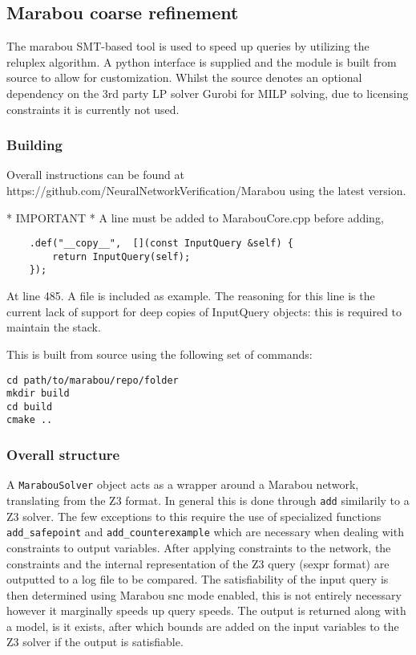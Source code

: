 \documentclass[a4paper,parskip=half]{scrartcl}
\begin{document}
\subsection{Marabou coarse refinement}

The marabou SMT-based tool is used to speed up queries by utilizing the reluplex algorithm. A python interface is supplied and the module is built from source to allow for customization. Whilst the source denotes an optional dependency on the 3rd party LP solver Gurobi for MILP solving, due to licensing constraints it is currently not used.

\subsubsection{Building}

Overall instructions can be found at https://github.com/NeuralNetworkVerification/Marabou using the latest version. 

* IMPORTANT * 
A line must be added to MarabouCore.cpp before adding, 

\begin{verbatim}
    .def("__copy__",  [](const InputQuery &self) {
        return InputQuery(self);
    });
\end{verbatim}

At line 485. A file is included as example. The reasoning for this line is the current lack of support for deep copies of InputQuery objects: this is required to maintain the stack.

This is built from source using the following set of commands:

\begin{verbatim}
cd path/to/marabou/repo/folder
mkdir build 
cd build
cmake ..
\end{verbatim}

\subsubsection{Overall structure}

A \verb+MarabouSolver+ object acts as a wrapper around a Marabou network, translating from the Z3 format. In general this is done through \verb+add+ similarily to a Z3 solver. The few exceptions to this require the use of specialized functions \verb+add_safepoint+ and \verb+add_counterexample+ which are necessary when dealing with constraints to output variables. After applying constraints to the network, the constraints and the internal representation of the Z3 query (sexpr format) are outputted to a log file to be compared. The satisfiability of the input query is then determined using Marabou snc mode enabled, this is not entirely necessary however it marginally speeds up query speeds. The output is returned along with a model, is it exists, after which bounds are added on the input variables to the Z3 solver if the output is satisfiable.
\end{document}
